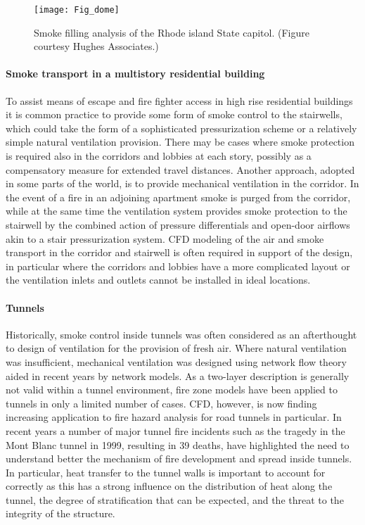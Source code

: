 \documentclass[graybox]{svmult}
\begin{document}
\begin{figure}[ht]
\texttt{[image: Fig\_dome]}
\caption{Smoke filling analysis of the Rhode island State capitol. (Figure courtesy Hughes Associates.)}
\label{Dome}
\end{figure}




\paragraph{Smoke transport in a multistory residential building}

To assist means of escape and fire fighter access in high rise residential buildings it is common practice to provide some form of smoke control to the stairwells, which could take the form of a sophisticated pressurization scheme or a relatively simple natural ventilation provision. There may be cases where smoke protection is required also in the corridors and lobbies at each story, possibly as a compensatory measure for extended travel distances. Another approach, adopted in some parts of the world, is to provide mechanical ventilation in the corridor. In the event of a fire in an adjoining apartment smoke is purged from the corridor, while at the same time the ventilation system provides smoke protection to the stairwell by the combined action of pressure differentials and open-door airflows akin to a stair pressurization system. CFD modeling of the air and smoke transport in the corridor and stairwell is often required in support of the design, in particular where the corridors and lobbies have a more complicated layout or the ventilation inlets and outlets cannot be installed in ideal locations.



\paragraph{Tunnels}

Historically, smoke control inside tunnels was often considered as an afterthought to design of ventilation for the provision of fresh air. Where natural ventilation was insufficient, mechanical ventilation was designed using network flow theory aided in recent years by network models. As a two-layer description is generally not valid within a tunnel environment, fire zone models have been applied to tunnels in only a limited number of cases. CFD, however, is now finding increasing application to fire hazard analysis for road tunnels in particular. In recent years a number of major tunnel fire incidents such as the tragedy in the Mont Blanc tunnel in 1999, resulting in 39 deaths, have highlighted the need to understand better the mechanism of fire development and spread inside tunnels. In particular, heat transfer to the tunnel walls is important to account for correctly as this has a strong influence on the distribution of heat along the tunnel, the degree of stratification that can be expected, and the threat to the integrity of the structure.
\end{document}
